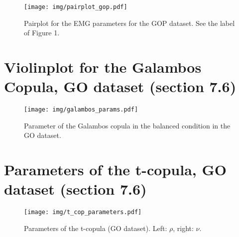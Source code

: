 \documentclass{article}
\begin{document}
\begin{figure}[htbp]
    \centering
    \texttt{[image: img/pairplot\_gop.pdf]}
    \caption{Pairplot for the EMG parameters for the GOP dataset. See the label of Figure 1.}
\end{figure}


\section{Violinplot for the Galambos Copula, GO dataset (section 7.6)}
\begin{figure}[htbp]
    \centering
    \texttt{[image: img/galambos\_params.pdf]}
    \caption{Parameter of the Galambos copula in the balanced condition in the GO dataset.}
    \label{<label>}
\end{figure}


\section{Parameters of the t-copula, GO dataset (section 7.6)}
\begin{figure}[htbp]
    \centering
    \texttt{[image: img/t\_cop\_parameters.pdf]}
    \caption{Parameters of the t-copula (GO dataset). Left: $\rho$, right: $\nu$.}
\end{figure}
\end{document}
